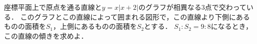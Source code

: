 \documentclass[../../main.tex]{subfiles}
\begin{document}
座標平面上で原点を通る直線と$y=x|x+2|$のグラフが相異なる$3$点で交わっている．
このグラフとこの直線によって囲まれる図形で，この直線より下側にあるものの面積を$S_1$，上側にあるものの面積を$S_2$とする．
$S_1:S_2=9:8$になるとき，この直線の傾きを求めよ．
\end{document}
